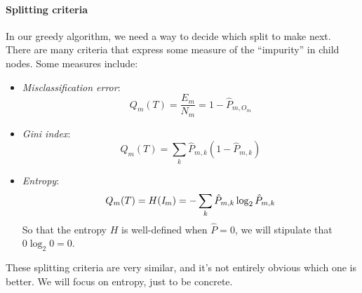 \paragraph*{Splitting criteria}
In our greedy algorithm, we need a way to decide which split to make
next.  There are many criteria that express some measure of the
``impurity'' in child nodes.  Some measures include:
\begin{itemize}
  \item {\em Misclassification error}:
        \begin{equation}
          Q_m(T) = \frac{E_m}{N_m} = 1 - \hat{P}_{m,O_m}
        \end{equation}
  \item {\em Gini index}:
        \begin{equation}
          Q_m(T) = \sum_k \hat{P}_{m,k}(1 - \hat{P}_{m,k})
        \end{equation}
  \item {\em Entropy}: 
        \begin{equation}
          Q_m(T) = H({\emph I}_m) = - \sum_k \hat{P}_{m,k} \log_2 \hat{P}_{m,k}
        \end{equation}
        So that the entropy $H$ is well-defined when $\hat{P} = 0$, we will stipulate that $0 \log_2 0 = 0$.
\end{itemize}
These splitting criteria are very similar, and it's not entirely obvious which one is
better.  We will focus on entropy, just to be concrete.

